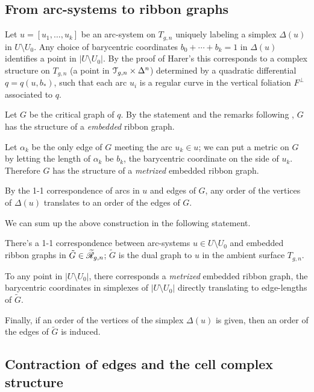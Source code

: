 \subsection{From arc-systems to ribbon graphs}
\label{sec:arcs-to-rg}

Let $u = [u_1, \ldots, u_k]$ be an arc-system on $T_{g,n}$ uniquely
labeling a simplex $\Delta(u)$ in $U \setminus U_0$.  Any choice of barycentric
coordinates $b_0 + \cdots + b_k = 1$ in $\Delta(u)$ identifies a point in $|U \setminus
U_0|$.  By the proof of Harer's  this corresponds to a
complex structure on $T_{g,n}$ (a point in $\T_{g,n} \times \Delta^n$)
determined by a quadratic differential $q = q(u, b_*)$, such that each
arc $u_i$ is a regular curve in the vertical foliation $F^\perp$
associated to $q$.

Let $G$ be the critical graph of $q$.  By the statement and the
remarks following , $G$ has the structure of a
\emph{embedded} ribbon graph.

Let $\alpha_k$ be the only edge of $G$ meeting the arc $u_k \in u$; we can
put a metric on $G$ by letting the length of $\alpha_k$ be $b_k$, the
barycentric coordinate on the side of $u_k$.  Therefore $G$ has the
structure of a \emph{metrized} embedded ribbon graph.

By the 1-1 correspondence of arcs in $u$ and edges of $G$, any order
of the vertices of $\Delta(u)$ translates to an order of the edges of $G$.

We can sum up the above construction in the following statement.
\begin{lemma}
  \label{lemma:arcs-to-rg}
  There's a 1-1 correspondence between arc-systems $u \in U \setminus U_0$ and
  embedded ribbon graphs in $\tilde G \in \ERG[g,n]$; $\tilde G$ is the
  dual graph to $u$ in the ambient surface $T_{g,n}$.

  To any point in $|U \setminus U_0|$, there corresponds a \emph{metrized}
  embedded ribbon graph, the barycentric coordinates in simplexes of
  $|U \setminus U_0|$ directly translating to edge-lengths of $\tilde G$.

  Finally, if an order of the vertices of the simplex $\Delta(u)$ is given,
  then an order of the edges of $\tilde G$ is induced.
\end{lemma}


\subsection{Contraction of edges and the cell complex structure}
\label{sec:contractions-and-topology}

